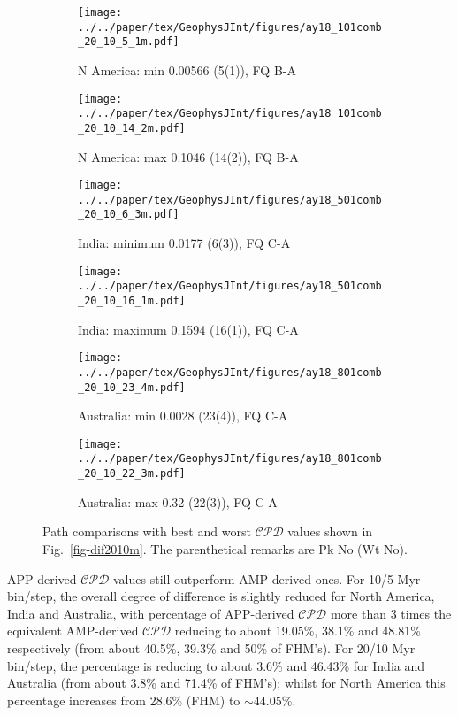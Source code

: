 \begin{figure}
  \vspace{-1.5cm}
  \centering
  \begin{subfigure}{.43\textwidth}
    \texttt{[image: ../../paper/tex/GeophysJInt/figures/ay18\_101comb\_20\_10\_5\_1m.pdf]}
    \caption{N America: min 0.00566 (5(1)), FQ B-A}
  \end{subfigure}
  \begin{subfigure}{.43\textwidth}
    \texttt{[image: ../../paper/tex/GeophysJInt/figures/ay18\_101comb\_20\_10\_14\_2m.pdf]}
    \caption{N America: max 0.1046 (14(2)), FQ B-A}
  \end{subfigure}
  \vspace{.1em}
  \begin{subfigure}{.43\textwidth}
    \texttt{[image: ../../paper/tex/GeophysJInt/figures/ay18\_501comb\_20\_10\_6\_3m.pdf]}
    \caption{India: minimum 0.0177 (6(3)), FQ C-A}
  \end{subfigure}
  \begin{subfigure}{.43\textwidth}
    \texttt{[image: ../../paper/tex/GeophysJInt/figures/ay18\_501comb\_20\_10\_16\_1m.pdf]}
    \caption{India: maximum 0.1594 (16(1)), FQ C-A}
  \end{subfigure}
  \vspace{.1em}
  \begin{subfigure}{.43\textwidth}
    \texttt{[image: ../../paper/tex/GeophysJInt/figures/ay18\_801comb\_20\_10\_23\_4m.pdf]}
    \caption{Australia: min 0.0028 (23(4)), FQ C-A}
  \end{subfigure}
  \begin{subfigure}{.43\textwidth}
    \texttt{[image: ../../paper/tex/GeophysJInt/figures/ay18\_801comb\_20\_10\_22\_3m.pdf]}
    \caption{Australia: max 0.32 (22(3)), FQ C-A}
  \end{subfigure}
  \caption[Best and worst $\mathcal{CPD}$s (20/10 Myr window/step; MHM)]{Path
    comparisons with best and worst $\mathcal{CPD}$ values shown in
    Fig.~\ref{fig-dif2010m}. The parenthetical remarks are Pk No (Wt
    No).}\label{fig-dif2010bwm}
\end{figure}

APP-derived $\mathcal{CPD}$ values still outperform AMP-derived ones. For 10/5
Myr bin/step, the overall degree of difference is slightly reduced for North
America, India and Australia, with percentage of APP-derived $\mathcal{CPD}$
more than 3 times the equivalent AMP-derived $\mathcal{CPD}$ reducing to about
19.05\%, 38.1\% and 48.81\% respectively (from about 40.5\%, 39.3\% and 50\% of
FHM's). For 20/10 Myr bin/step, the percentage is reducing to about 3.6\% and
46.43\% for India and Australia (from about 3.8\% and 71.4\% of FHM's); whilst
for North America this percentage increases from 28.6\% (FHM) to
${\sim}44.05$\%.

